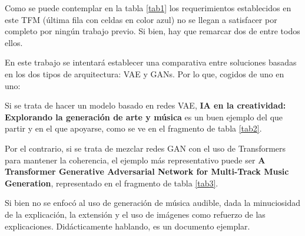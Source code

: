 

Como se puede contemplar en la tabla \ref{tab1} los requerimientos establecidos en este TFM (última fila con celdas en color azul) no se llegan a satisfacer por completo por ningún trabajo previo. Si bien, hay que remarcar dos de entre todos ellos.

En este trabajo se intentará establecer una comparativa entre soluciones basadas en los dos tipos de arquitectura: VAE y GANs. Por lo que, cogidos de uno en uno:



Si se trata de hacer un modelo basado en redes VAE, \textbf{IA en la creatividad: Explorando la generación de arte y música} es un buen ejemplo del que partir y en el que apoyarse, como se ve en el fragmento de tabla \ref{tab2}.



Por el contrario, si se trata de mezclar redes GAN con el uso de Transformers para mantener la coherencia, el ejemplo más representativo puede ser \textbf{A Transformer Generative Adversarial Network for Multi-Track Music Generation}, representado en el fragmento de tabla \ref{tab3}.

Si bien no se enfocó al uso de generación de música audible, dada la minuciosidad de la explicación, la extensión y el uso de imágenes como refuerzo de las explicaciones. Didácticamente hablando, es un documento ejemplar.



